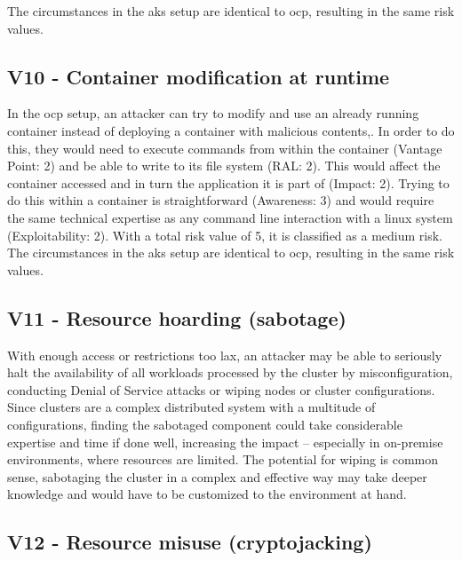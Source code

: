 The circumstances in the \gls{aks} setup are identical to \gls{ocp}, resulting in the same risk values.

\subsection{V10 - Container modification at runtime}

In the \gls{ocp} setup, an attacker can try to modify and use an already running container instead of deploying a container with malicious contents,. In order to do this, they would need to execute commands from within the container (Vantage Point: 2) and be able to write to its file system (RAL: 2). This would affect the container accessed and in turn the application it is part of (Impact: 2).
Trying to do this within a container is straightforward (Awareness: 3) and would require the same technical expertise as any command line interaction with a linux system (Exploitability: 2).
With a total risk value of 5, it is classified as a medium risk. \\

The circumstances in the \gls{aks} setup are identical to \gls{ocp}, resulting in the same risk values.

\subsection{V11 - Resource hoarding (sabotage)}

With enough access or restrictions too lax, an attacker may be able to seriously halt the availability of all workloads processed by the cluster by misconfiguration, conducting Denial of Service attacks or wiping nodes or cluster configurations. Since clusters are a complex distributed system with a multitude of configurations, finding the sabotaged component could take considerable expertise and time if done well, increasing the impact – especially in on-premise environments, where resources are limited.
The potential for wiping is common sense, sabotaging the cluster in a complex and effective way may take deeper knowledge and would have to be customized to the environment at hand.

\subsection{V12 - Resource misuse (cryptojacking)}

